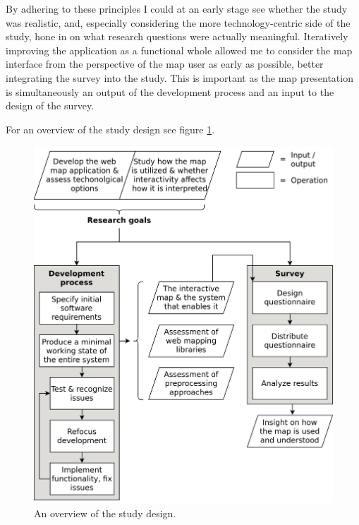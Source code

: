 By adhering to these principles I could at an early stage see
whether the study was realistic, and,
especially considering the more technology-centric side of the study,
hone in on what research questions were actually meaningful.
Iteratively improving the application as a functional whole
allowed me to consider the map interface
from the perspective of the map user as early as possible,
better integrating the survey into the study.
This is important as the map presentation is simultaneously an output of the development process
and an input to the design of the survey.

For an overview of the study design see figure \ref{fig:study design}.


\begin{figure}[H]
	\centering
	\includegraphics[width=\diagramwidth]{visual/figures/diagrams/study_design.png}
	\caption{An overview of the study design.}
	\label{fig:study design}
\end{figure}


